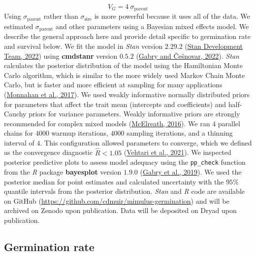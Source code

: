 \documentclass[
  12pt,
]{article}
\begin{document}
\[V_G = 4~\sigma_{\mathrm{parent}}\]
Using \(\sigma_{\mathrm{parent}}\) rather than \(\sigma_{\mathrm{sire}}\) is more powerful because it uses all of the data. We estimated \(\sigma_{\mathrm{parent}}\) and other parameters using a Bayesian mixed effects model. We describe the general approach here and provide detail specific to germination rate and survival below. We fit the model in \emph{Stan} version \(2.29.2\) (\protect\hyperlink{ref-stan_development_team_stan_2022}{Stan Development Team, 2022}) using \textbf{cmdstanr} version \(0.5.2\) (\protect\hyperlink{ref-gabry_cmdstanr_2022}{Gabry and Češnovar, 2022}). \emph{Stan} calculates the posterior distribution of the model using the Hamiltonian Monte Carlo algorithm, which is similar to the more widely used Markov Chain Monte Carlo, but is faster and more efficient at sampling for many applications (\protect\hyperlink{ref-monnahan_faster_2017}{Monnahan et al., 2017}). We used weakly informative normally distributed priors for parameters that affect the trait mean (intercepts and coefficients) and half-Cauchy priors for variance parameters. Weakly informative priors are strongly recommended for complex mixed models (\protect\hyperlink{ref-mcelreath_statistical_2016}{McElreath, 2016}). We ran \(4\) parallel chains for \(4000\) warmup iterations, \(4000\) sampling iterations, and a thinning interval of \(4\). This configuration allowed parameters to converge, which we defined as the convergence diagnostic \(\hat{R} < 1.05\) (\protect\hyperlink{ref-vehtari_rank-normalization_2021}{Vehtari et al., 2021}). We inspected posterior predictive plots to assess model adequacy using the \texttt{pp\_check} function from the \emph{R} package \textbf{bayesplot} version \(1.9.0\) (\protect\hyperlink{ref-gabry_visualization_2019}{Gabry et al., 2019}). We used the posterior median for point estimates and calculated uncertainty with the \(95\)\% quantile intervals from the posterior distribution. \emph{Stan} and \emph{R} code are available on GitHub (\url{https://github.com/cdmuir/mimulus-germination}) and will be archived on Zenodo upon publication. Data will be deposited on Dryad upon publication.

\hypertarget{germination-rate}{%
\subsection{Germination rate}\label{germination-rate}}
\end{document}
